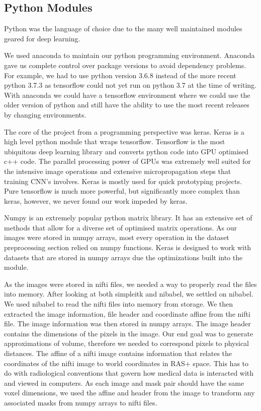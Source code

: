 \documentclass[12pt]{article}
\begin{document}
\subsection{Python Modules}

\par
Python was the language of choice due to the many well maintained modules geared for deep learning.
\par
We used anaconda to maintain our python programming environment.
Anaconda gave us complete control over package versions to avoid dependency problems.
For example, we had to use python version 3.6.8 instead of the more recent python 3.7.3 as tensorflow could not yet run on python 3.7 at the time of writing.
With anaconda we could have a tensorflow environment where we could use the older version of python and still have the ability to use the most recent releases by changing environments.
\par
The core of the project from a programming perspective was keras.
Keras is a high level python module that wraps tensorflow.
Tensorflow is the most ubiquitous deep learning library and converts python code into GPU optimised c++ code.
The parallel processing power of GPUs was extremely well suited for the intensive image operations and extensive micropropagation steps that training CNN's involves.
Keras is mostly used for quick prototyping projects.
Pure tensorflow is much more powerful, but significantly more complex than keras, however, we never found our work impeded by keras.
\par
Numpy is an extremely popular python matrix library.
It has an extensive set of methods that allow for a diverse set of optimised matrix operations.
As our images were stored in numpy arrays, most every operation in the dataset preprocessing section relied on numpy functions.
Keras is designed to work with datasets that are stored in numpy arrays due the optimizations built into the module.
\par
As the images were stored in nifti files, we needed a way to properly read the files into memory.
After looking at both simpleitk and nibabel, we settled on nibabel.
We used nibabel to read the nifti files into memory from storage.
We then extracted the image information, file header and coordinate affine from the nifti file.
The image information was then stored in numpy arrays.
The image header contains the dimensions of the pixels in the image.
Our end goal was to generate approximations of volume, therefore we needed to correspond pixels to physical distances.
The affine of a nifti image contains information that relates the coordinates of the nifti image to world coordinates in RAS+ space. 
This has to do with radiological conventions that govern how medical data is interacted with and viewed in computers.
As each image and mask pair should have the same voxel dimensions, we used the affine and header from the image to transform any associated masks from numpy arrays to nifti files. 
\end{document}
